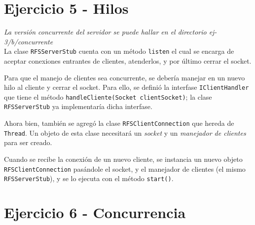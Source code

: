\section{Ejercicio 5 - Hilos}

\emph{La versión concurrente del servidor se puede hallar en el directorio ej-3/b/concurrente} 
~\\

La clase \texttt{RFSServerStub} cuenta con un método \texttt{listen} el cual se encarga de aceptar conexiones entrantes de clientes, atenderlos, y por último cerrar el socket.

Para que el manejo de clientes sea concurrente, se debería manejar en un nuevo hilo al cliente y cerrar el socket. Para ello, se definió la interfase \texttt{IClientHandler} que tiene el método \texttt{handleCliente(Socket clientSocket)}; la clase \texttt{RFSServerStub} ya implementaría dicha interfase. 

Ahora bien, también se agregó la clase \texttt{RFSClientConnection} que hereda de \texttt{Thread}. Un objeto de esta clase necesitará un \emph{socket} y un \emph{manejador de clientes} para ser creado.   

Cuando se recibe la conexión de un nuevo cliente, se instancia un nuevo objeto \texttt{RFSClientConnection} pasándole el socket, y el manejador de clientes (el mismo \texttt{RFSServerStub}), y se lo ejecuta con el método \texttt{start()}.

\section{Ejercicio 6 - Concurrencia}










\clearpage
\printbibliography



